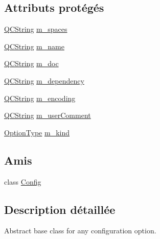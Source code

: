 \subsection*{Attributs protégés}
\begin{DoxyCompactItemize}
\item 
\hyperlink{class_q_c_string}{Q\+C\+String} \hyperlink{class_config_option_aa3ef6fe13a480dad1404aee1bb0f2d11}{m\+\_\+spaces}
\item 
\hyperlink{class_q_c_string}{Q\+C\+String} \hyperlink{class_config_option_a4f081d447f2443212d0d032da63b20d7}{m\+\_\+name}
\item 
\hyperlink{class_q_c_string}{Q\+C\+String} \hyperlink{class_config_option_a28fdea8e9fdf86e73faae697454c17ab}{m\+\_\+doc}
\item 
\hyperlink{class_q_c_string}{Q\+C\+String} \hyperlink{class_config_option_a5146ef81dc662e3c5b2f1e9d1f3c600e}{m\+\_\+dependency}
\item 
\hyperlink{class_q_c_string}{Q\+C\+String} \hyperlink{class_config_option_a4953007ad225b5996adf18275f59e922}{m\+\_\+encoding}
\item 
\hyperlink{class_q_c_string}{Q\+C\+String} \hyperlink{class_config_option_a5e54ead18c124c6c6c03ed3b678a7103}{m\+\_\+user\+Comment}
\item 
\hyperlink{class_config_option_ad60cb308cdf307e72796dc2fc2a40fda}{Option\+Type} \hyperlink{class_config_option_a64896a35334d6ab865f8038fb65024ac}{m\+\_\+kind}
\end{DoxyCompactItemize}
\subsection*{Amis}
\begin{DoxyCompactItemize}
\item 
class \hyperlink{class_config_option_ac3da7e21a05bf8852638db7e4dd1b81a}{Config}
\end{DoxyCompactItemize}


\subsection{Description détaillée}
Abstract base class for any configuration option. 

